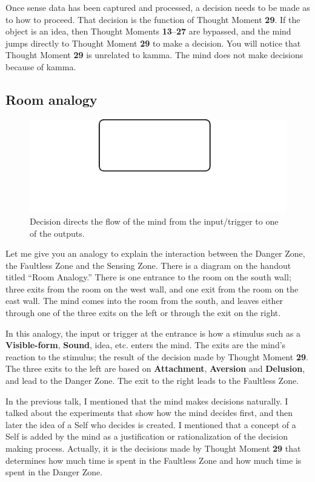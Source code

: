 Once sense data has been captured and processed, a decision needs to be made as to how to proceed. That decision is the function of Thought Moment \textbf{29}. If the object is an idea, then Thought Moments \textbf{13}--\textbf{27} are bypassed, and the mind jumps directly to Thought Moment \textbf{29} to make a decision. You will notice that Thought Moment \textbf{29} is unrelated to kamma. The mind does not make decisions because of kamma.

\subsection*{Room analogy}

\begin{figure}[h]
\centering
\includegraphics[width=0.4\linewidth]{./Diagrams/Room}
\caption{Decision directs the flow of the mind from the input/trigger to one of the outputs.}
\label{fig:Room}
\end{figure}

Let me give you an analogy to explain the interaction between the Danger Zone, the Faultless Zone and the Sensing Zone. There is a diagram on the handout titled “Room Analogy.” There is one entrance to the room on the south wall; three exits from the room on the west wall, and one exit from the room on the east wall. The mind comes into the room from the south, and leaves either through one of the three exits on the left or through the exit on the right.

In this analogy, the input or trigger at the entrance is how a stimulus such as a \textbf{Visible-form}, \textbf{Sound}, idea, etc. enters the mind. The exits are the mind’s reaction to the stimulus; the result of the decision made by Thought Moment \textbf{29}. The three exits to the left are based on \textbf{Attachment}, \textbf{Aversion} and \textbf{Delusion}, and lead to the Danger Zone. The exit to the right leads to the Faultless Zone.

In the previous talk, I mentioned that the mind makes decisions naturally. I talked about the experiments that show how the mind decides first, and then later the idea of a Self who decides is created. I mentioned that a concept of a Self is added by the mind as a justification or rationalization of the decision making process. Actually, it is the decisions made by Thought Moment \textbf{29} that determines how much time is spent in the Faultless Zone and how much time is spent in the Danger Zone.


